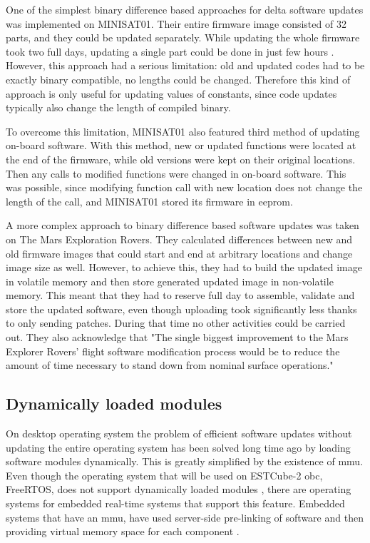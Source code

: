 
One of the simplest binary difference based approaches for delta software updates was implemented on MINISAT01. Their entire firmware image consisted of 32 parts, and they could be updated separately. While updating the whole firmware took two full days, updating a single part could be done in just few hours \cite{Garrido1998}. However, this approach had a serious limitation: old and updated codes had to be exactly binary compatible, no lengths could be changed. Therefore this kind of approach is only useful for updating values of constants, since code updates typically also change the length of compiled binary.

To overcome this limitation, MINISAT01 also featured third method of updating on-board software. With this method, new or updated functions were located at the end of the firmware, while old versions were kept on their original locations. Then any calls to modified functions were changed in on-board software. This was possible, since modifying function call with new location does not change the length of the call, and MINISAT01 stored its firmware in \gls{eeprom}. \cite{Garrido1998} 

A more complex approach to binary difference based software updates was taken on The Mars Exploration Rovers. They calculated differences between new and old firmware images that could start and end at arbitrary locations and change image size as well. However, to achieve this, they had to build the updated image in volatile memory and then store generated updated image in non-volatile memory. This meant that they had to reserve full day to assemble, validate and store the updated software, even though uploading took significantly less thanks to only sending patches. During that time no other activities could be carried out. They also acknowledge that "The single biggest improvement to the Mars Explorer Rovers' flight software modification process would be to reduce the amount of time necessary to stand down from nominal surface operations." \cite{Greco2005}

\subsection{Dynamically loaded modules}

On desktop operating system the problem of efficient software updates without updating the entire operating system has been solved long time ago by loading software modules dynamically. This is greatly simplified by the existence of \gls{mmu}. Even though the operating system that will be used on ESTCube-2 \gls{obc}, FreeRTOS, does not support dynamically loaded modules \cite{Barry2005}, there are operating systems for embedded real-time systems that support this feature. Embedded systems that have an \gls{mmu}, have used server-side pre-linking of software and then providing virtual memory space for each component \cite{Shen2010}.

